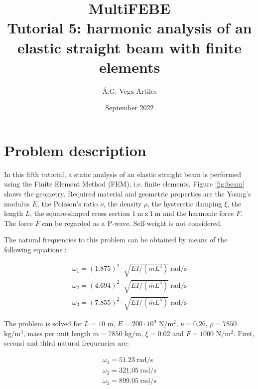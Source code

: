 \documentclass[a4]{article}
\title{MultiFEBE \\ Tutorial 5: harmonic analysis of an elastic straight beam with finite elements}
\author{\'A.G. Vega-Artiles}
\date{September 2022}
\begin{document}
\maketitle

\tableofcontents 

\section{Problem description}

In this fifth tutorial, a static analysis of an elastic straight beam is performed using the Finite Element Method (FEM), i.e. finite elements. Figure \ref{fig:beam} shows the geometry. Required material and geometric properties are the Young's modulus $E$, the Poisson's ratio $\nu$, the density $\rho$, the hysteretic damping $\xi$, the length $L$, the square-shaped cross section $1 \medspace \mathrm{m} \medspace \mathrm{x} \medspace 1 \medspace \mathrm{m}$ and the harmonic force $F$. The force $F$ can be regarded as a P-wave. Self-weight is not considered. 

The natural frequencies to this problem can be obtained by means of the following equations \cite{clough}:

\begin{equation}
	\begin{array}{l}
		\omega_1 = (1.875)^2 \cdot \sqrt{EI /(\overline{m}L^4)} \medspace \mathrm{rad/s} \\
		\omega_2 = (4.694)^2 \cdot \sqrt{EI /(\overline{m}L^4)} \medspace \mathrm{rad/s} \\
		\omega_3 = (7.855)^2 \cdot \sqrt{EI /(\overline{m}L^4)} \medspace \mathrm{rad/s}
	\end{array}
\end{equation}

The problem is solved for $L=10$ $\mathrm{m}$, $E=200\cdot 10^9$ $\mathrm{N/m^2}$, $\nu=0.26$, $\rho=7850$ $\mathrm{kg/m^3}$, mass per unit length $\overline{m}=7850$ $\mathrm{kg/m}$, $\xi=0.02$ and $F=1000$ $\mathrm{N/m^2}$. First, second and third natural frequencies are: 

\begin{equation}
	\begin{array}{l}
		\omega_1 = 51.23 \medspace \mathrm{rad/s} \\
		\omega_2 = 321.05 \medspace \mathrm{rad/s} \\
		\omega_3 = 899.05 \medspace \mathrm{rad/s}
	\end{array}
\end{equation}
\end{document}
